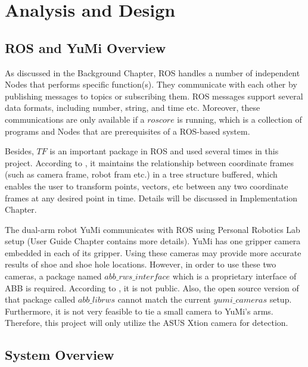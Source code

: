 \chapter{Analysis and Design}

\section{ROS and YuMi Overview}
As discussed in the Background Chapter, ROS handles a number of independent Nodes that performs specific function(s). They communicate with each other by publishing messages to topics or subscribing them. ROS messages support several data formats, including number, string, and time etc. Moreover, these communications are only available if a $roscore$ is running, which is a collection of programs and Nodes that are prerequisites of a ROS-based system.

Besides, $TF$ is an important package in ROS and used several times in this project. According to \citep{tfROSWik}, it maintains the relationship between coordinate frames (such as camera frame, robot fram etc.) in a tree structure buffered, which enables the user to transform points, vectors, etc between any two coordinate frames at any desired point in time. Details will be discussed in Implementation Chapter.

The dual-arm robot YuMi communicates with ROS using Personal Robotics Lab setup (User Guide Chapter contains more details). YuMi has one gripper camera embedded in each of its gripper. Using these cameras may provide more accurate results of shoe and shoe hole locations. However, in order to use these two cameras, a package named $abb\_rws\_interface$ which is a proprietary interface of ABB is required. According to \citep{EGMfiles}, it is not public. Also, the open source version of that package called $abb\_librws$ cannot match the current $yumi\_cameras$ setup. Furthermore, it is not very feasible to tie a small camera to YuMi's arms. Therefore, this project will only utilize the ASUS Xtion camera for detection.

\section{System Overview}

